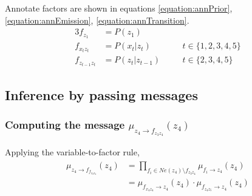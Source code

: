 \documentclass[a4paper,12pt]{article}
\newcommand{\given}{\ | \ }
\newcommand{\msgNtoF}[2]{\mu_{#1 \rightarrow f_{#2}}(#1)}
\newcommand{\msgFtoN}[2]{\mu_{f_{#1} \rightarrow #2}(#2)}
\newcommand{\msgFtoNCond}[3]{\mu_{f_{#1} \rightarrow #2}(#2 \given #3)}
\begin{document}
Annotate factors are shown in 
equations \ref{equation:annPrior}, \ref{equation:annEmission}, \ref{equation:annTransition}. 
%
\begin{alignat}{3}
\label{equation:annPrior}
f_{z_{1}} &= P(z_{1}) && \\
\label{equation:annEmission}
f_{x_{t}z_{t}} &= P(x_{t} | z_{t}) && t \in \{1,2,3,4,5\} \\
\label{equation:annTransition}
f_{z_{t-1} z_{t}} &= P(z_{t} | z_{t-1}) \quad && t \in \{2,3,4,5\}
\end{alignat}

\clearpage
\subsection{Inference by passing messages}
\subsubsection{Computing the message $\msgNtoF{z_4}{z_3 z_4}$}
Applying the variable-to-factor rule,
\begin{align}
\begin{split}
\msgNtoF{z_4}{f_{z_3 z_4}}
& = \prod_{f_i \in Ne(z_4) \setminus f_{z_3 z_4}} \msgFtoN{i}{z_4} \\
& = \msgFtoN{x_4 z_4}{z_4} \cdot \msgFtoN{z_4 z_5}{z_4}
\end{split}
\end{align}

\clearpage 


\end{document}
